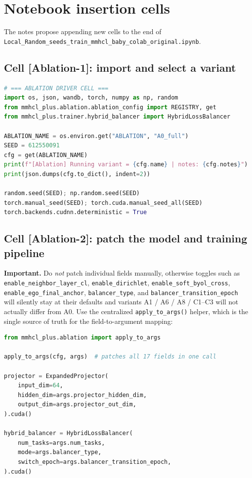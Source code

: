 \documentclass[11pt,a4paper]{article}
\begin{document}
\section{Notebook insertion cells}
The notes propose appending new cells to the end of \texttt{Local\_Random\_seeds\_train\_mmhcl\_baby\_colab\_original.ipynb}.

\subsection{Cell [Ablation-1]: import and select a variant}
\begin{lstlisting}[language=Python]
# === ABLATION DRIVER CELL ===
import os, json, wandb, torch, numpy as np, random
from mmhcl_plus.ablation.ablation_config import REGISTRY, get
from mmhcl_plus.trainer.hybrid_balancer import HybridLossBalancer

ABLATION_NAME = os.environ.get("ABLATION", "A0_full")
SEED = 612550091
cfg = get(ABLATION_NAME)
print(f"[Ablation] Running variant = {cfg.name} | notes: {cfg.notes}")
print(json.dumps(cfg.to_dict(), indent=2))

random.seed(SEED); np.random.seed(SEED)
torch.manual_seed(SEED); torch.cuda.manual_seed_all(SEED)
torch.backends.cudnn.deterministic = True
\end{lstlisting}

\subsection{Cell [Ablation-2]: patch the model and training pipeline}

\textbf{Important.} Do \emph{not} patch individual fields manually, otherwise
toggles such as \texttt{enable\_neighbor\_layer\_cl}, \texttt{enable\_dirichlet},
\texttt{enable\_soft\_byol\_cross}, \texttt{enable\_ego\_final\_anchor},
\texttt{balancer\_type}, and \texttt{balancer\_transition\_epoch} will silently
stay at their defaults and variants A1 / A6 / A8 / C1--C3 will not actually
differ from A0. Use the centralized \texttt{apply\_to\_args()} helper, which is
the single source of truth for the field-to-argument mapping:

\begin{lstlisting}[language=Python]
from mmhcl_plus.ablation import apply_to_args

apply_to_args(cfg, args)  # patches all 17 fields in one call

projector = ExpandedProjector(
    input_dim=64,
    hidden_dim=args.projector_hidden_dim,
    output_dim=args.projector_out_dim,
).cuda()

hybrid_balancer = HybridLossBalancer(
    num_tasks=args.num_tasks,
    mode=args.balancer_type,
    switch_epoch=args.balancer_transition_epoch,
).cuda()
\end{lstlisting}
\end{document}

